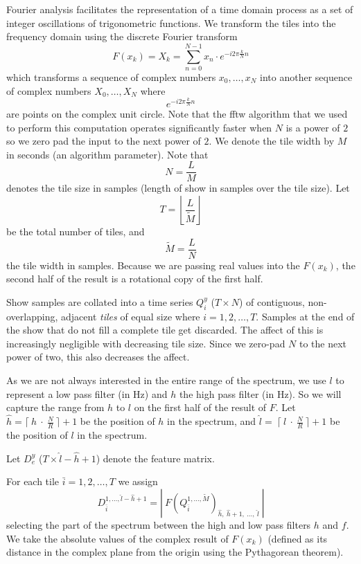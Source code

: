 \documentclass[twocolumn]{article}
\begin{document}
	Fourier analysis facilitates the representation of a time domain process as a set of integer oscillations of trigonometric functions. We transform the tiles into the frequency domain using the discrete Fourier transform
\[
F(x_k) = X_k = \sum_{n=0}^{N-1} x_n \cdot e^{-i 2 \pi \frac{k}{N} n}
\] which transforms a sequence of complex numbers $x_0,\ldots,x_N$ into another sequence of complex numbers $X_0,\ldots,X_N$ where $$e^{-i 2 \pi \frac{k}{N} n}$$ are points on the complex unit circle. Note that the fftw algorithm \cite{frigo2004fftw} that we used to perform this computation operates significantly faster when $N$ is a power of $2$ so we zero pad the input to the next power of $2$. We denote the tile width by $M$ in seconds (an algorithm parameter). Note that
\[
N = \frac{L}{M}
\] denotes the tile size in samples (length of show in samples over the tile size). Let 
\[
T = \left\lfloor\frac{L}{\tilde{M}}\right\rfloor
\] be the total number of tiles, and \[
\tilde{M}=\frac{L}{N}
\] the tile width in samples.
Because we are passing real values into the $F(x_k)$, the second half of the result is a rotational copy of the first half.
	
	Show samples are collated into a time series $Q_i^y$ ($T \times N$) of contiguous, non-overlapping, adjacent \emph{tiles} of equal size where $i=1,2,\ldots, T$. Samples at the end of the show that do not fill a complete tile get discarded. The affect of this is increasingly negligible with decreasing tile size. Since we zero-pad $N$ to the next power of two, this also decreases the affect.
	
	As we are not always interested in the entire range of the spectrum, we use $l$ to represent a low pass filter (in Hz) and $h$ the high pass filter (in Hz). So we will capture the range from $h$ to $l$ on the first half of the result of $F$. Let $\hat{h} = \lceil~h~\cdot~\frac{{N}}{R} ~\rceil+1$ be the position of $h$ in the spectrum, and $\hat l=~\lceil~l~\cdot~\frac{{N}}{R}~\rceil+1$ be the position of $l$ in the spectrum.
	
	Let $D_e^y$ ($T \times \hat{l}-\hat{h}+1$) denote the feature matrix.
	
	For each tile $\bar{i}=1,2,\ldots,T$ we assign 
\[
D_{\bar{i}}^{1,\ldots,\hat{l}-\hat{h}+1} = \left|~F(Q_{\bar{i}}^{1,\ldots,\tilde{M}})_{\hat{h},~\hat{h}+1,~\ldots,~\hat{l} }~\right|
\]
 selecting the part of the spectrum between the high and low pass filters $h$ and $f$.  We take the absolute values of the complex result of $F(x_k)$ (defined as its distance in the complex plane from the origin using the Pythagorean theorem).
	
\end{document}
